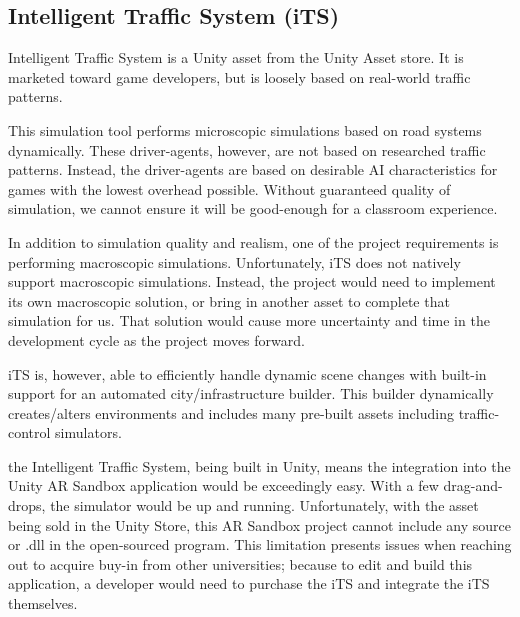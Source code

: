 \documentclass[IEEEtran]{article}
\begin{document}
\subsection{Intelligent Traffic System (iTS)}
\par Intelligent Traffic System is a Unity asset from the Unity Asset store. It is marketed toward game developers, but is loosely based on real-world traffic patterns.\cite{10}
\par This simulation tool performs microscopic simulations based on road systems dynamically. These driver-agents, however, are not based on researched traffic patterns. Instead, the driver-agents are based on desirable AI characteristics for games with the lowest overhead  possible. Without guaranteed quality of simulation, we cannot ensure it will be good-enough for a classroom experience.
\par In addition to simulation quality and realism, one of the project requirements is performing macroscopic simulations. Unfortunately, iTS does not natively support macroscopic simulations. Instead, the project would need to implement its own macroscopic solution, or bring in another asset to complete that simulation for us. That solution would cause more uncertainty and time in the development cycle as the project moves forward. 
\par iTS is, however, able to efficiently handle dynamic scene changes with built-in support for an automated city/infrastructure builder. This builder dynamically creates/alters environments and includes many pre-built assets including traffic-control simulators.
\par the Intelligent Traffic System, being built in Unity, means the integration into the Unity AR Sandbox application would be exceedingly easy. With a few drag-and-drops, the simulator would be up and running. Unfortunately, with the asset being sold in the Unity Store, this AR Sandbox project cannot include any source or .dll in the open-sourced program. This limitation presents issues when reaching out to acquire buy-in from other universities; because to edit and build this application, a developer would need to purchase the iTS and integrate the iTS themselves.
\end{document}
